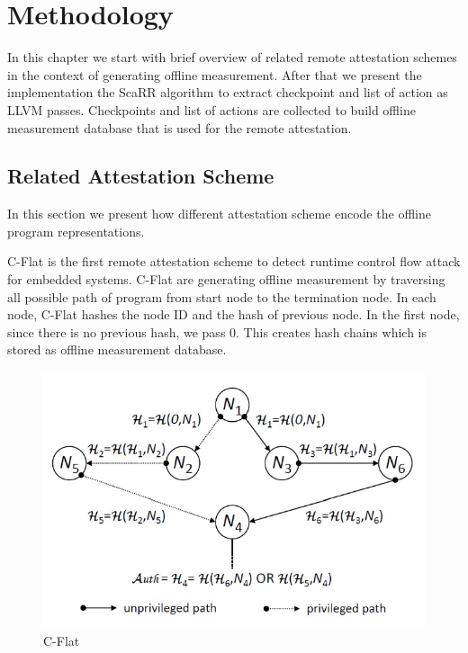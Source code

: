 
\chapter{Methodology} %

\label{Chapter4} %

In this chapter we start with brief overview of related remote attestation schemes in the context of generating offline measurement. After that we present the implementation the ScaRR algorithm to extract checkpoint and list of action as LLVM passes. Checkpoints and list of actions are collected to build offline measurement database that is used for the remote attestation.

\section{Related Attestation Scheme}


In this section we present how different attestation scheme encode the offline program representations.

C-Flat \cite{aberaCFLATControlFlowAttestation2016} is the first remote attestation scheme to detect runtime control flow attack for embedded systems. C-Flat are generating offline measurement by traversing all possible path of program from start node to the termination node. In each node, C-Flat hashes the node ID and the hash of previous node. In the first node, since there is no previous hash, we pass 0. This creates hash chains which is stored as offline measurement database.

\begin{figure}[htbp]
\centerline{\includegraphics[scale=.5]{Figures/cflat.png}}
\caption{C-Flat}
\label{fig:4-1}
\end{figure}


